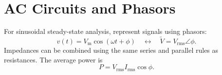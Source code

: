 \documentclass[12pt,a4paper]{article}
\begin{document}
\section{AC Circuits and Phasors}

For sinusoidal steady-state analysis, represent signals using phasors:
\begin{equation}
	v(t) = V_{\mathrm{m}}\cos(\omega t + \phi)
	\quad\longleftrightarrow\quad
	\tilde V = V_{\mathrm{rms}}\angle\phi.
\end{equation}
Impedances can be combined using the same series and parallel rules as
resistances. The average power is
\begin{equation}
	P = V_{\mathrm{rms}}I_{\mathrm{rms}}\cos\phi.
\end{equation}
\end{document}
